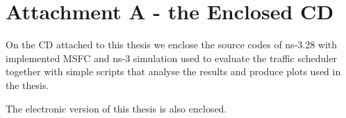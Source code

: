 \documentclass[12pt,a4paper,twoside,openright]{report}
\let\openright=\cleardoublepage
\begin{document}



\tableofcontents











\listoffigures

\listoftables

\renewcommand{\nomname}{List of Abbreviations}

\appendix



\section*{Attachment A - the Enclosed CD}
\label{attachment}
On the CD attached to this thesis we enclose the source codes of ns-3.28 with implemented MSFC and ns-3 simulation used to evaluate the traffic scheduler together with simple scripts that analyse the results and produce plots used in the thesis.

The electronic version of this thesis is also enclosed.

\openright
\end{document}
